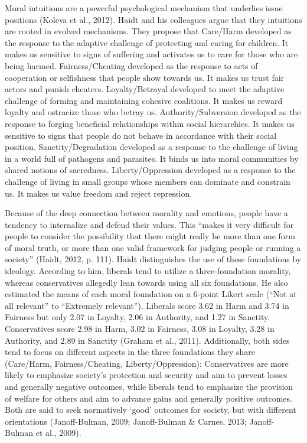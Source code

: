 \documentclass[12pt,econ]{sources/authesis}
\begin{document}
Moral intuitions are a powerful psychological mechanism that underlies issue positions (Koleva et al., 2012). Haidt and his colleagues argue that they intuitions are rooted in evolved mechanisms. They propose that Care/Harm developed as the response to the adaptive challenge of protecting and caring for children. It makes us sensitive to signs of suffering and activates us to care for those who are being harmed. Fairness/Cheating developed as the response to acts of cooperation or selfishness that people show towards us. It makes us trust fair actors and punish cheaters. Loyalty/Betrayal developed to meet the adaptive challenge of forming and maintaining cohesive coalitions. It makes us reward loyalty and ostracize those who betray us. Authority/Subversion developed as the response to forging beneficial relationships within social hierarchies. It makes us sensitive to signs that people do not behave in accordance with their social position. Sanctity/Degradation developed as a response to the challenge of living in a world full of pathogens and parasites. It binds us into moral communities by shared notions of sacredness. Liberty/Oppression developed as a response to the challenge of living in small groups whose members can dominate and constrain us. It makes us value freedom and reject repression.

Because of the deep connection between morality and emotions, people have a tendency to internalize and defend their values. This ``makes it very difficult for people to consider the possibility that there might really be more than one form of moral truth, or more than one valid framework for judging people or running a society'' (Haidt, 2012, p. 111). Haidt distinguishes the use of these foundations by ideology. According to him, liberals tend to utilize a three-foundation morality, whereas conservatives allegedly lean towards using all six foundations. He also estimated the means of each moral foundation on a 6-point Likert scale (``Not at all relevant'' to ``Extremely relevant''). Liberals score 3.62 in Harm and 3.74 in Fairness but only 2.07 in Loyalty, 2.06 in Authority, and 1.27 in Sanctity. Conservatives score 2.98 in Harm, 3.02 in Fairness, 3.08 in Loyalty, 3.28 in Authority, and 2.89 in Sanctity (Graham et al., 2011). Additionally, both sides tend to focus on different aspects in the three foundations they share (Care/Harm, Fairness/Cheating, Liberty/Oppression): Conservatives are more likely to emphasize society's protection and security and aim to prevent losses and generally negative outcomes, while liberals tend to emphasize the provision of welfare for others and aim to advance gains and generally positive outcomes. Both are said to seek normatively `good' outcomes for society, but with different orientations (Janoff-Bulman, 2009; Janoff-Bulman \& Carnes, 2013; Janoff-Bulman et al., 2009).
\end{document}
